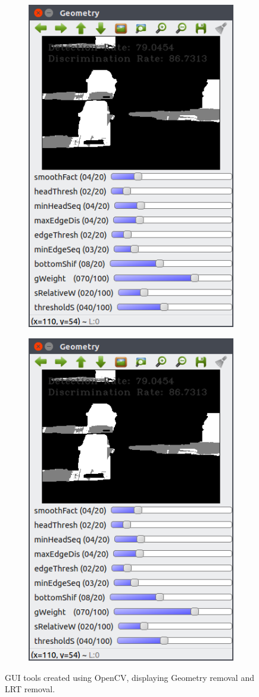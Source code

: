 \begin{figure}
\centering
\begin{subfigure}{.49\linewidth}
  \centering
  \includegraphics[width=.7\linewidth]{figures/geo_highway1_default.png}
\end{subfigure}
\hfill
\begin{subfigure}{.49\linewidth}
  \centering
  \includegraphics[width=.7\linewidth]{figures/geo_highway1_default.png}
\end{subfigure}
\caption{GUI tools created using OpenCV, displaying Geometry removal and LRT removal.}
\label{fig:guitools}
\end{figure}

